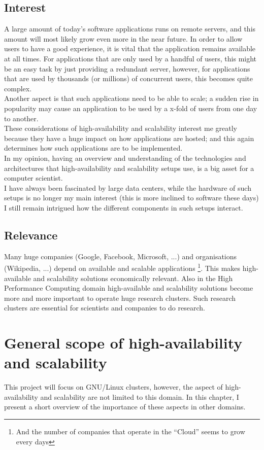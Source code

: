 \documentclass[12pt]{report}
\begin{document}
\section{Interest}
A large amount of today's software applications runs on remote servers, and
this amount will most likely grow even more in the near future. In
order to allow users to have a good experience, it is vital that the
application remains available at all times. For applications that are only
used by a handful of users, this might be an easy task by just
providing a redundant server, however, for applications that are used
by thousands (or millions) of concurrent users, this becomes
quite complex.\\
Another aspect is that such applications need to be able to scale; a
sudden rise in popularity may cause an application to be used by a
x-fold of users from one day to another.\\
These considerations of high-availability and scalability interest me
greatly because they have a huge impact on how applications are
hosted; and this again determines how such applications are to be
implemented.\\
In my opinion, having an overview and understanding of the technologies and
architectures that high-availability and scalability setups use,
is a big asset for a computer scientist.\\
I have always been fascinated by large data centers,
while the hardware of such setups is no longer my main interest (this
is more inclined to software these days) I still remain intrigued how
the different components in such setups interact.

\section{Relevance}
Many huge companies (Google, Facebook, Microsoft, ...) and
organisations (Wikipedia, ...) depend on available and scalable
applications \footnote{And the number of companies that operate in the
  ``Cloud'' seems to grow every days}. This makes
high-available and scalability solutions economically relevant.
Also in the High Performance Computing domain high-available and
scalability solutions become more and more important to operate huge
research clusters. Such research clusters are essential for scientists
and companies to do research.

\chapter{General scope of high-availability and scalability}
This project will focus on GNU/Linux clusters, however,
the aspect of high-availability and scalability are not limited to
this domain. In this chapter, I present a short overview of the
importance of these aspects in other domains.
\end{document}
